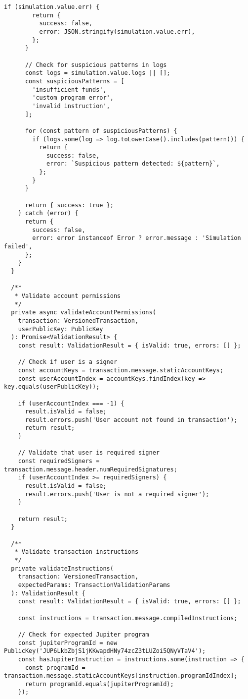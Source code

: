 \documentclass[11pt,a4paper]{article}
\begin{document}
\begin{lstlisting}[style=typescript, caption=Secure Transaction Handling]
      if (simulation.value.err) {
        return {
          success: false,
          error: JSON.stringify(simulation.value.err),
        };
      }
      
      // Check for suspicious patterns in logs
      const logs = simulation.value.logs || [];
      const suspiciousPatterns = [
        'insufficient funds',
        'custom program error',
        'invalid instruction',
      ];
      
      for (const pattern of suspiciousPatterns) {
        if (logs.some(log => log.toLowerCase().includes(pattern))) {
          return {
            success: false,
            error: `Suspicious pattern detected: ${pattern}`,
          };
        }
      }
      
      return { success: true };
    } catch (error) {
      return {
        success: false,
        error: error instanceof Error ? error.message : 'Simulation failed',
      };
    }
  }
  
  /**
   * Validate account permissions
   */
  private async validateAccountPermissions(
    transaction: VersionedTransaction,
    userPublicKey: PublicKey
  ): Promise<ValidationResult> {
    const result: ValidationResult = { isValid: true, errors: [] };
    
    // Check if user is a signer
    const accountKeys = transaction.message.staticAccountKeys;
    const userAccountIndex = accountKeys.findIndex(key => key.equals(userPublicKey));
    
    if (userAccountIndex === -1) {
      result.isValid = false;
      result.errors.push('User account not found in transaction');
      return result;
    }
    
    // Validate that user is required signer
    const requiredSigners = transaction.message.header.numRequiredSignatures;
    if (userAccountIndex >= requiredSigners) {
      result.isValid = false;
      result.errors.push('User is not a required signer');
    }
    
    return result;
  }
  
  /**
   * Validate transaction instructions
   */
  private validateInstructions(
    transaction: VersionedTransaction,
    expectedParams: TransactionValidationParams
  ): ValidationResult {
    const result: ValidationResult = { isValid: true, errors: [] };
    
    const instructions = transaction.message.compiledInstructions;
    
    // Check for expected Jupiter program
    const jupiterProgramId = new PublicKey('JUP6LkbZbjS1jKKwapdHNy74zcZ3tLUZoi5QNyVTaV4');
    const hasJupiterInstruction = instructions.some(instruction => {
      const programId = transaction.message.staticAccountKeys[instruction.programIdIndex];
      return programId.equals(jupiterProgramId);
    });
    

\end{lstlisting}
\end{document}
